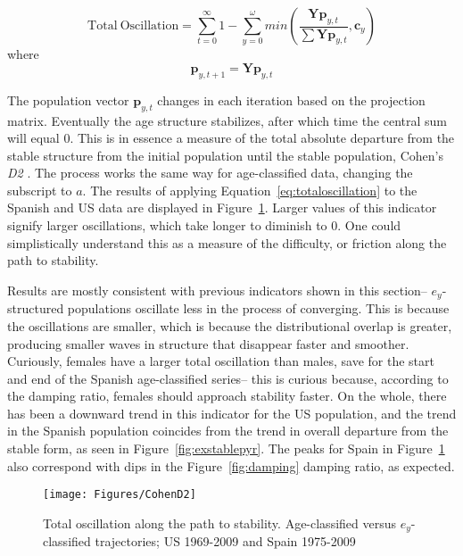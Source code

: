 \begin{equation}
\label{eq:totaloscillation}
\mathrm{Total~Oscillation} = \sum _{t=0} ^\infty 1 - \sum _{y=0} ^\omega
min \left( \frac{\boldsymbol{Y} \boldsymbol{p}_{y,t}}{\sum \boldsymbol{Y}
\boldsymbol{p}_{y,t}}, \boldsymbol{c}_y \right)
\end{equation}
where
\begin{equation}
\boldsymbol{p}_{y,t+1} = \boldsymbol{Y} \boldsymbol{p}_{y,t}
\end{equation}

The population vector $\textbf{p}_{y,t}$ changes in each iteration based on the
projection matrix. Eventually the age structure stabilizes, after which time the central sum will
equal 0. This is in essence a measure of the total absolute departure from the
stable structure from the initial population until the stable population,
Cohen's \textit{D2} \citep{caswell2001matrix}. The process works the same way
for age-classified data, changing the subscript to $a$. The results of applying
Equation~\eqref{eq:totaloscillation} to the Spanish and US data are displayed
in Figure~\ref{fig:exCohenD2}. Larger values of this indicator signify larger
oscillations, which take longer to diminish to 0. One could
simplistically understand this as a measure of the difficulty, or friction along
the path to stability.

Results are mostly consistent with previous indicators shown in this section--
$e_y$-structured populations oscillate less in the process of converging. This
is because the oscillations are smaller, which is because the distributional
overlap is greater, producing smaller waves in structure that disappear faster
and smoother. Curiously, females have a larger total oscillation than males,
save for the start and end of the Spanish age-classified series-- this is
curious because, according to the damping ratio, females should approach
stability faster. On the whole, there has been a downward trend in this
indicator for the US population, and the trend in the Spanish population
coincides from the trend in overall departure from the stable form, as seen in
Figure~\ref{fig:exstablepyr}. The peaks for Spain in Figure~\ref{fig:exCohenD2}
also correspond with dips in the Figure~\ref{fig:damping} damping ratio, as
expected.

\begin{figure}[ht!]
       \centering
       \caption{Total oscillation along the path to
       stability. Age-classified versus $e_y$-classified trajectories; US
       1969-2009 and Spain 1975-2009}
        \texttt{[image: Figures/CohenD2]}
        \label{fig:exCohenD2}
\end{figure}


